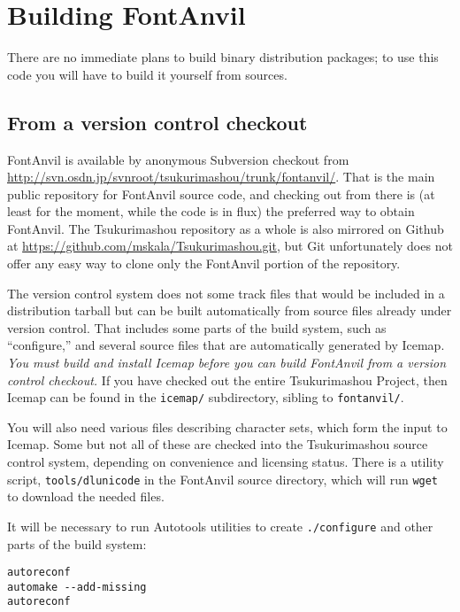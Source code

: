 
\chapter{Building FontAnvil}

There are no immediate plans to build binary distribution packages; to use
this code you will have to build it yourself from sources.

\section{From a version control checkout}

FontAnvil is available by anonymous Subversion checkout from
\url{http://svn.osdn.jp/svnroot/tsukurimashou/trunk/fontanvil/}. 
That is the main public repository for FontAnvil source code, and checking
out from there is (at least for the moment, while the code is in flux) the
preferred way to obtain FontAnvil.  The Tsukurimashou repository as a whole
is also mirrored on Github at
\url{https://github.com/mskala/Tsukurimashou.git}, but Git unfortunately
does not offer any easy way to clone only the FontAnvil portion of the
repository.

The version control system does not some track files that would be included
in a distribution tarball but can be built automatically from source files
already under version control.  That includes some parts of the build
system, such as ``configure,'' and several source files that are
automatically generated by Icemap.  \emph{You must build and install Icemap
before you can build FontAnvil from a version control checkout.} If you have
checked out the entire Tsukurimashou Project, then Icemap can be found in
the \texttt{icemap/} subdirectory, sibling to \texttt{fontanvil/}.

You will also need various files describing character sets, which form the
input to Icemap.  Some but not all of these are checked into the
Tsukurimashou source control system, depending on convenience and licensing
status.  There is a utility script, \texttt{tools/dlunicode} in the
FontAnvil source directory, which will run \texttt{wget} to download the
needed files.

It will be necessary to run Autotools utilities to create
\texttt{./configure} and other parts of the build system:

\begin{verbatim}
autoreconf
automake --add-missing
autoreconf
\end{verbatim}


